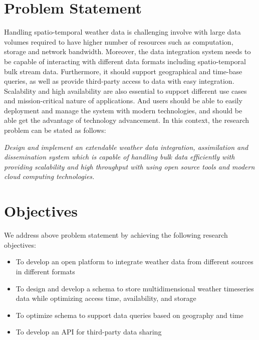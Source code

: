 \section{Problem Statement}
Handling spatio-temporal weather data is challenging  involve with large data volumes required to have higher number of resources such as computation, storage and network bandwidth. Moreover, the data integration system needs to be capable of interacting with different data formats including spatio-temporal bulk stream data. Furthermore, it should support geographical and time-base queries, as well as provide third-party access to data with easy integration. Scalability and high availability are also essential to support different use cases and mission-critical nature of applications. And users should be able to easily deployment and manage the system with modern technologies, and should be able get the advantage of technology advancement. In this context, the research problem can be stated as follows:
 
\emph{Design and implement an extendable weather data integration, assimilation and dissemination system which is capable of handling bulk data efficiently with providing scalability and high throughput with using open source tools and modern cloud computing technologies.}

\section{Objectives}
We address above problem statement by achieving the following research objectives:
\begin{itemize}
    \item To develop an open platform to integrate weather data from different sources in different formats
    \item To design and develop a schema to store multidimensional weather timeseries data while optimizing access time, availability, and storage
    \item To optimize schema to support data queries based on geography and time
    \item To develop an API for third-party data sharing
\end{itemize}
